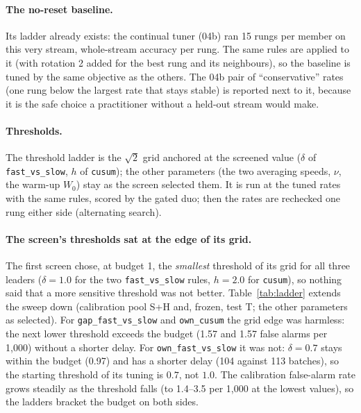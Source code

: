 \documentclass[10pt]{article}
\newcommand{\rl}[1]{\texttt{#1}}
\begin{document}
\paragraph{The no-reset baseline.} Its ladder already exists: the continual tuner (04b) ran 15 rungs per member on this very stream, whole-stream accuracy per rung. The same rules are applied to it (with rotation 2 added for the best rung and its neighbours), so the baseline is tuned by the same objective as the others. The 04b pair of ``conservative'' rates (one rung below the largest rate that stays stable) is reported next to it, because it is the safe choice a practitioner without a held-out stream would make.

\paragraph{Thresholds.} The threshold ladder is the $\sqrt2$ grid anchored at the screened value ($\delta$ of \rl{fast\_vs\_slow}, $h$ of \rl{cusum}); the other parameters (the two averaging speeds, $\nu$, the warm-up $W_0$) stay as the screen selected them. It is run at the tuned rates with the same rules, scored by the gated duo; then the rates are rechecked one rung either side (alternating search).

\paragraph{The screen's thresholds sat at the edge of its grid.} The first screen chose, at budget 1, the \emph{smallest} threshold of its grid for all three leaders ($\delta = 1.0$ for the two \rl{fast\_vs\_slow} rules, $h = 2.0$ for \rl{cusum}), so nothing said that a more sensitive threshold was not better. Table~\ref{tab:ladder} extends the sweep down (calibration pool S+H and, frozen, test T; the other parameters as selected). For \rl{gap\_fast\_vs\_slow} and \rl{own\_cusum} the grid edge was harmless: the next lower threshold exceeds the budget (1.57 and 1.57 false alarms per 1,000) without a shorter delay. For \rl{own\_fast\_vs\_slow} it was not: $\delta = 0.7$ stays within the budget (0.97) and has a shorter delay (104 against 113 batches), so the starting threshold of its tuning is $0.7$, not $1.0$. The calibration false-alarm rate grows steadily as the threshold falls (to 1.4--3.5 per 1,000 at the lowest values), so the ladders bracket the budget on both sides.
\end{document}
